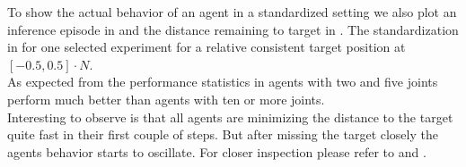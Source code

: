 To show the actual behavior of an agent in a standardized setting we also plot an inference episode in  and the distance remaining to target in . The standardization in  for one selected experiment for a relative consistent target position at $[-0.5, 0.5] \cdot N$. \\
As expected from the performance statistics in  agents with two and five joints perform much better than agents with ten or more joints. \\
Interesting to observe is that all agents are minimizing the distance to the target quite fast in their first couple of steps. But after missing the target closely the agents behavior starts to oscillate.
For closer inspection please refer to  and . 


